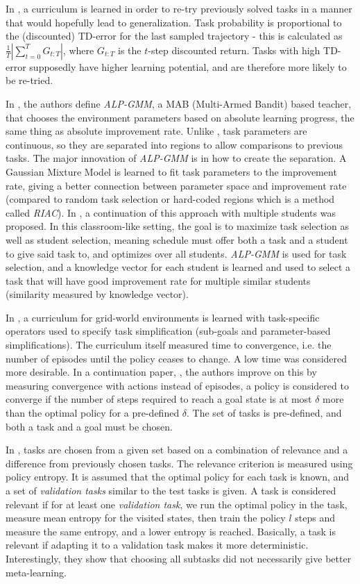 \documentclass[letterpaper]{article}
\theoremstyle{definition}
\begin{document}
In \cite{Jiang2020}, a curriculum is learned in order to re-try previously solved tasks in a manner that would hopefully lead to generalization. Task probability is proportional to the (discounted) TD-error for the last sampled trajectory - this is calculated as $ \frac{1}{T} | \sum_{t=0}^{T} {G_{t:T}}|$, where $G_{t:T}$ is the $t$-step discounted return. Tasks with high TD-error supposedly have higher learning potential, and are therefore more likely to be re-tried. 

In \cite{Portelas2019}, the authors define \textit{ALP-GMM}, a MAB (Multi-Armed Bandit) based teacher, that chooses the environment parameters based on absolute learning progress, the same thing as absolute improvement rate.
Unlike \cite{Matiisen2020}, task parameters are continuous, so they are separated into regions to allow comparisons to previous tasks. The major innovation of \textit{ALP-GMM} is in how to create the separation. A Gaussian Mixture Model is learned to fit task parameters to the improvement rate, giving a better connection between parameter space and improvement rate (compared to random task selection or hard-coded regions which is a method called \textit{RIAC}).
In \cite{Portelas2020}, a continuation of this approach with multiple students was proposed. In this classroom-like setting, the goal is to maximize task selection as well as student selection, meaning schedule must offer both a task and a student to give said task to, and optimizes over all students. \textit{ALP-GMM} is used for task selection, and a knowledge vector for each student is learned and used to select a task that will have good improvement rate for multiple similar students (similarity measured by knowledge vector).

In \cite{Narvekar2019}, a curriculum for grid-world environments is learned with task-specific operators used to specify task simplification (sub-goals and parameter-based simplifications). The curriculum itself measured time to convergence, i.e. the number of episodes until the policy ceases to change. A low time was considered more desirable.
In a continuation paper, \cite{Narvekar2020}, the authors improve on this by measuring convergence with actions instead of episodes, a policy is considered to converge if the number of steps required to reach a goal state is at most $\delta$ more than the optimal policy for a pre-defined $\delta$. The set of tasks is pre-defined, and both a task and a goal must be chosen.

In \cite{Gutierrez2020}, tasks are chosen from a given set based on a combination of relevance and a difference from previously chosen tasks. The relevance criterion is measured using policy entropy. It is assumed that the optimal policy for each task is known, and a set of \textit{validation tasks} similar to the test tasks is given.
A task is considered relevant if for at least one \textit{validation task}, we run the optimal policy in the task, measure mean entropy for the visited states, then train the policy $l$ steps and measure the same entropy, and a lower entropy is reached. Basically, a task is relevant if adapting it to a validation task makes it more deterministic.
Interestingly, they show that choosing all subtasks did not necessarily give better meta-learning.
\end{document}
